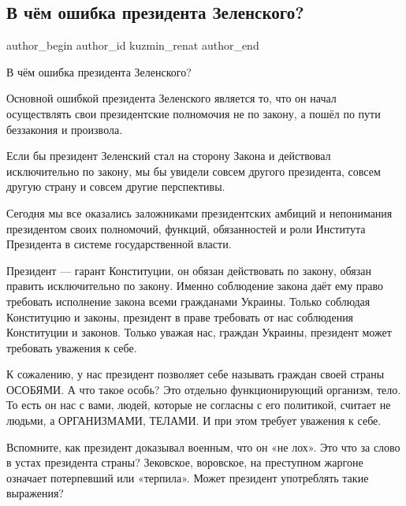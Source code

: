  
 
 
 
 
 
\subsection{В чём ошибка президента Зеленского?}
\label{sec:03_12_2021.fb.kuzmin_renat.1.oshybka_prezident}
 
\ifcmt
 author_begin
   author_id kuzmin_renat
 author_end
\fi

В чём ошибка президента Зеленского? 

Основной ошибкой президента Зеленского является то, что он начал осуществлять
свои президентские полномочия не по закону, а пошёл по пути беззакония и
произвола. 

Если бы президент Зеленский стал на сторону Закона и действовал исключительно
по закону, мы бы увидели совсем другого президента, совсем другую страну и
совсем другие перспективы. 

Сегодня мы все оказались заложниками президентских амбиций и непонимания
президентом своих полномочий, функций, обязанностей и роли Института Президента
в системе государственной власти. 

Президент — гарант Конституции, он обязан действовать по закону, обязан править
исключительно по закону. Именно соблюдение закона даёт ему право требовать
исполнение закона всеми гражданами Украины. Только соблюдая Конституцию и
законы, президент в праве требовать от нас соблюдения Конституции и законов.
Только уважая нас, граждан Украины, президент может требовать уважения к себе. 

К сожалению, у нас президент позволяет себе называть граждан своей страны
ОСОБЯМИ. А что такое особь? Это отдельно функционирующий организм, тело. То
есть он нас с вами, людей, которые не согласны с его политикой, считает не
людьми, а ОРГАНИЗМАМИ, ТЕЛАМИ. И при этом требует уважения к себе. 

Вспомните, как президент доказывал военным, что он «не лох». Это что за слово в
устах президента страны? Зековское, воровское, на преступном жаргоне означает
потерпевший или «терпила». Может президент употреблять такие выражения? 

